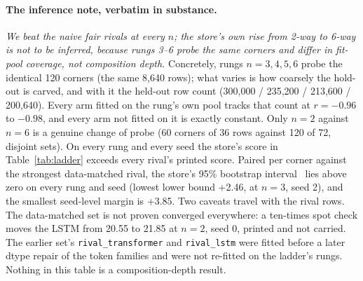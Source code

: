 \documentclass{article} %
\begin{document}
\paragraph{The inference note, verbatim in substance.} \emph{We beat the naive fair rivals at
every $n$; the store's own rise from 2-way to 6-way is not to be inferred, because rungs 3--6
probe the same corners and differ in fit-pool coverage, not composition depth.} Concretely,
rungs $n=3,4,5,6$ probe the identical 120 corners (the same 8,640 rows); what varies is how
coarsely the hold-out is carved, and with it the held-out row count (300,000 / 235,200 /
213,600 / 200,640). Every arm fitted on the rung's own pool tracks that count at
$r=-0.96$ to $-0.98$, and every arm not fitted on it is exactly constant.
Only $n=2$ against $n=6$ is a genuine change of probe (60 corners of 36 rows against 120 of
72, disjoint sets). %
On every rung and every seed the store's score in Table~\ref{tab:ladder} exceeds every rival's
printed score. Paired per corner against the strongest data-matched rival, the store's 95\% %
bootstrap interval~\citep{efron1979bootstrap} lies above zero on every rung and seed (lowest lower
bound +2.46, at $n=3$, seed 2), and the smallest seed-level margin is +3.85. Two caveats travel with %
the rival rows. The data-matched set is not proven converged everywhere: a ten-times spot check %
moves the LSTM from 20.55 to 21.85 at $n=2$, seed 0, printed and not carried. The earlier set's %
\texttt{rival\_transformer} and \texttt{rival\_lstm} were fitted before a later dtype repair of the
token families and were not re-fitted on the ladder's rungs. Nothing in this table is a
composition-depth result.
\end{document}
